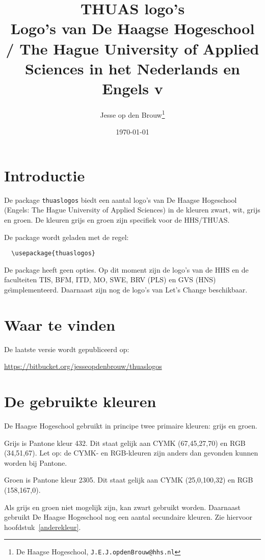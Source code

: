 \documentclass[a4paper,12pt]{article}
\author{Jesse op den Brouw\thanks{De Haagse Hogeschool, \texttt{J.E.J.opdenBrouw@hhs.nl}}}
\title{THUAS logo's\\[2ex] \large Logo's van De Haagse Hogeschool / The Hague University of Applied Sciences in het Nederlands en Engels v\fileversion}
\date{\today}
\begin{document}
\maketitle

\begin{multicols}{2}[\setlength{\columnsep}{30pt}\section*{\contentsname}]
\makeatletter
{}%
\makeatother
\end{multicols}
\clearpage

\section{Introductie}
De package \verb|thuaslogos| biedt een aantal logo's van De Haagse Hogeschool
(Engels: The Hague University of Applied Sciences) in de kleuren zwart, wit, grijs
en groen. De kleuren grijs en groen zijn specifiek voor de HHS/THUAS.

De package wordt geladen met de regel:

\verb|  \usepackage{thuaslogos}|

De package heeft geen opties. Op dit moment zijn de logo's van de HHS
en de faculteiten TIS, BFM, ITD, MO, SWE, BRV (PLS) en GVS (HNS) ge\"{\i}mplementeerd.
Daarnaast zijn nog de logo's van Let's Change beschikbaar.


\section{Waar te vinden}
De laatste versie wordt gepubliceerd op:

\url{https://bitbucket.org/jesseopdenbrouw/thuaslogos}


\section{De gebruikte kleuren}
De Haagse Hogeschool gebruikt in principe twee primaire kleuren: grijs en groen.

Grijs is Pantone kleur 432.
Dit staat gelijk aan CYMK (67,45,27,70) en RGB (34,51,67). Let op: de CYMK- en RGB-kleuren zijn anders dan gevonden kunnen worden bij Pantone.

Groen is Pantone kleur 2305. Dit staat gelijk aan CYMK (25,0,100,32) en RGB (158,167,0).

Als grijs en groen niet mogelijk zijn, kan zwart gebruikt worden. Daarnaast gebruikt
De Haagse Hogeschool nog een aantal secundaire kleuren. Zie hiervoor hoofdstuk~\ref{anderekleur}.
\end{document}
